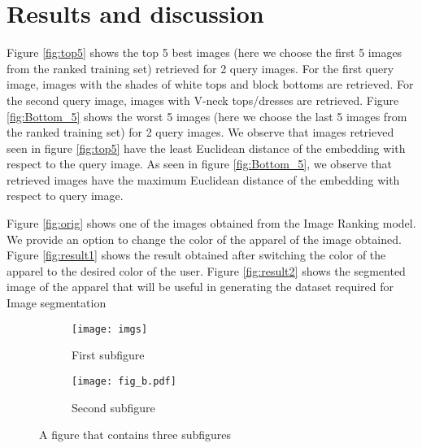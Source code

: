 \section{Results and discussion}

Figure \ref{fig:top5} shows the top 5 best images (here we choose the first 5 images from the ranked training set) retrieved for 2 query images. For the first query image, images with the shades of white tops and block bottoms are retrieved. For the second query image, images with V-neck tops/dresses are retrieved. Figure \ref{fig:Bottom_5} shows the worst 5 images (here we choose the last 5 images from the ranked training set) for 2 query images. We observe that images retrieved seen in figure \ref{fig:top5} have the least Euclidean distance of the embedding with respect to the query image. As seen in figure \ref{fig:Bottom_5}, we observe that retrieved images have the maximum Euclidean distance of the embedding with respect to query image.


Figure \ref{fig:orig} shows one of the images obtained from the Image Ranking model. We provide an option to change the color of the apparel of the image obtained. Figure \ref{fig:result1} shows the result obtained after switching the color of the apparel to the desired color of the user. Figure \ref{fig:result2} shows the segmented image of the apparel that will be useful in generating the dataset required for Image segmentation





\begin{figure}
\begin{subfigure}{0.1\textwidth}
\texttt{[image: imgs]}
\caption{First subfigure} \label{fig:1a}
\end{subfigure}
\hspace*{\fill} %
\begin{subfigure}{0.1\textwidth}
\texttt{[image: fig\_b.pdf]}
\caption{Second subfigure} \label{fig:1b}
\end{subfigure}
\caption{A figure that contains three subfigures} \label{fig:1}
\end{figure}


